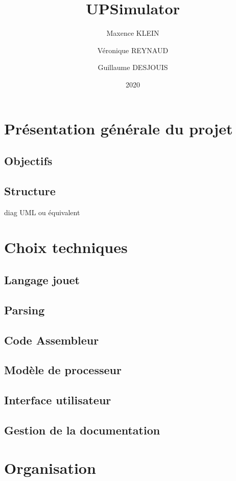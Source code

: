 \documentclass[10pt]{scrreprt} %
\title{UPSimulator}
\author{Maxence KLEIN\\ \and Véronique REYNAUD\\ \and Guillaume DESJOUIS }
\date{2020}
\begin{document}
\maketitle
\tableofcontents
\clearpage

\section{Présentation générale du projet}
\subsection{Objectifs}

\subsection{Structure}
diag UML ou équivalent

\clearpage
\section{Choix techniques}
\subsection{Langage jouet}



\subsection{Parsing}




\subsection{Code Assembleur}
\subsection{Modèle de processeur}
\subsection{Interface utilisateur}
\subsection{Gestion de la documentation}
\section{Organisation}
\end{document}
